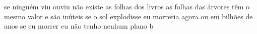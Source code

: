 \begin{poem}
\begin{stanza}
se ninguém viu \qquad ouviu\verseline
não existe\verseline
\qquad as folhas dos livros\verseline
\qquad as folhas das árvores\verseline
\qquad têm o mesmo valor\verseline
\qquad e são inúteis\verseline
se o sol explodisse\verseline
eu morreria\verseline
agora ou\verseline
em bilhões de anos\verseline
\qquad se eu morrer eu não tenho\verseline
\qquad \qquad nenhum plano b
 \end{stanza}
 \end{poem}